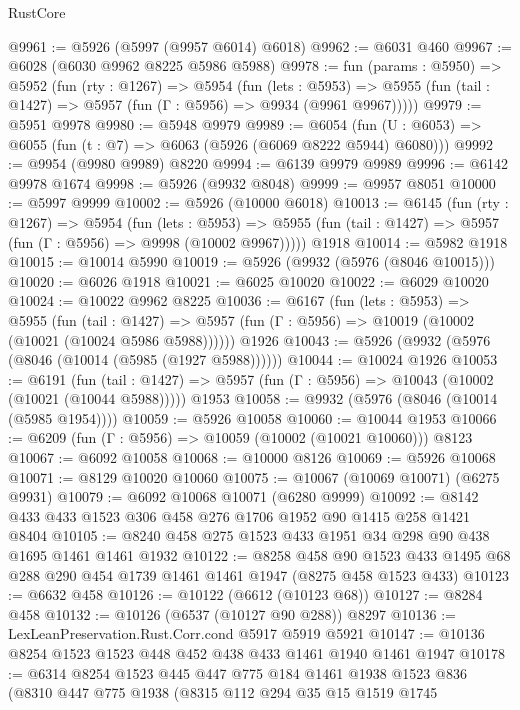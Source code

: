 \begin{lexlean}{RustCore}
\begin{coremodule}
@9961 := @5926 (@5997 (@9957 @6014) @6018)
@9962 := @6031 @460
@9967 := @6028 (@6030 @9962 @8225 @5986 @5988)
@9978 := fun (params : @5950) =>
  @5952
    (fun (rty : @1267) =>
    @5954
      (fun (lets : @5953) =>
      @5955 (fun (tail : @1427) => @5957 (fun (Γ : @5956) => @9934 (@9961 @9967)))))
@9979 := @5951 @9978
@9980 := @5948 @9979
@9989 := @6054 (fun (U : @6053) => @6055 (fun (t : @7) => @6063 (@5926 (@6069 @8222 @5944) @6080)))
@9992 := @9954 (@9980 @9989) @8220
@9994 := @6139 @9979 @9989
@9996 := @6142 @9978 @1674
@9998 := @5926 (@9932 @8048)
@9999 := @9957 @8051
@10000 := @5997 @9999
@10002 := @5926 (@10000 @6018)
@10013 := @6145
    (fun (rty : @1267) =>
    @5954
      (fun (lets : @5953) =>
      @5955 (fun (tail : @1427) => @5957 (fun (Γ : @5956) => @9998 (@10002 @9967)))))
    @1918
@10014 := @5982 @1918
@10015 := @10014 @5990
@10019 := @5926 (@9932 (@5976 (@8046 @10015)))
@10020 := @6026 @1918
@10021 := @6025 @10020
@10022 := @6029 @10020
@10024 := @10022 @9962 @8225
@10036 := @6167
    (fun (lets : @5953) =>
    @5955
      (fun (tail : @1427) =>
      @5957 (fun (Γ : @5956) => @10019 (@10002 (@10021 (@10024 @5986 @5988))))))
    @1926
@10043 := @5926 (@9932 (@5976 (@8046 (@10014 (@5985 (@1927 @5988))))))
@10044 := @10024 @1926
@10053 := @6191
    (fun (tail : @1427) => @5957 (fun (Γ : @5956) => @10043 (@10002 (@10021 (@10044 @5988)))))
    @1953
@10058 := @9932 (@5976 (@8046 (@10014 (@5985 @1954))))
@10059 := @5926 @10058
@10060 := @10044 @1953
@10066 := @6209 (fun (Γ : @5956) => @10059 (@10002 (@10021 @10060))) @8123
@10067 := @6092 @10058
@10068 := @10000 @8126
@10069 := @5926 @10068
@10071 := @8129 @10020 @10060
@10075 := @10067 (@10069 @10071) (@6275 @9931)
@10079 := @6092 @10068 @10071 (@6280 @9999)
@10092 := @8142 @433 @433 @1523 @306 @458 @276 @1706 @1952 @90 @1415 @258 @1421 @8404
@10105 := @8240 @458 @275 @1523 @433 @1951 @34 @298 @90 @438 @1695 @1461 @1461 @1932
@10122 := @8258
    @458
    @90
    @1523
    @433
    @1495
    @68
    @288
    @290
    @454
    @1739
    @1461
    @1461
    @1947
    (@8275 @458 @1523 @433)
@10123 := @6632 @458
@10126 := @10122 (@6612 (@10123 @68))
@10127 := @8284 @458
@10132 := @10126 (@6537 (@10127 @90 @288)) @8297
@10136 := LexLeanPreservation.Rust.Corr.cond @5917 @5919 @5921
@10147 := @10136 @8254 @1523 @1523 @448 @452 @438 @433 @1461 @1940 @1461 @1947
@10178 := @6314
    @8254
    @1523
    @445
    @447
    @775
    @184
    @1461
    @1938
    @1523
    @836
    (@8310
      @447
      @775
      @1938
      (@8315
        @112
        @294
        @35
        @15
        @1519
        @1745

\end{coremodule}
\end{lexlean}
